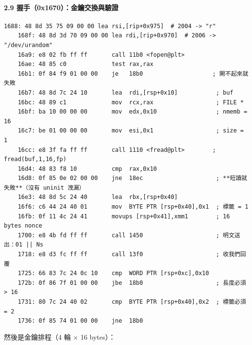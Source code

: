 \documentclass[10pt,a4paper]{article}
\begin{document}
\paragraph{2.9
握手（0x1670）：金鑰交換與驗證}\label{ux63e1ux624b0x1670ux91d1ux9470ux4ea4ux63dbux8207ux9a57ux8b49}

\begin{Verbatim}[breaklines=true,breakanywhere=true,breakautoindent=false,fontsize=\fontsize{7.0}{9.5}\selectfont]
    1688: 48 8d 35 75 09 00 00 lea rsi,[rip+0x975]  # 2004 -> "r"
    168f: 48 8d 3d 70 09 00 00 lea rdi,[rip+0x970]  # 2006 -> "/dev/urandom"
    16a9: e8 02 fb ff ff       call 11b0 <fopen@plt>
    16ae: 48 85 c0             test rax,rax
    16b1: 0f 84 f9 01 00 00    je   18b0                    ; 開不起來就失敗
    16b7: 48 8d 7c 24 10       lea  rdi,[rsp+0x10]           ; buf
    16bc: 48 89 c1             mov  rcx,rax                  ; FILE *
    16bf: ba 10 00 00 00       mov  edx,0x10                 ; nmemb = 16
    16c7: be 01 00 00 00       mov  esi,0x1                  ; size = 1
    16cc: e8 3f fa ff ff       call 1110 <fread@plt>        ; fread(buf,1,16,fp)
    16d4: 48 83 f8 10          cmp  rax,0x10
    16d8: 0f 85 0e 02 00 00    jne  18ec                     ; **短讀就失敗**（沒有 uninit 洩漏）
    16e3: 48 8d 5c 24 40       lea  rbx,[rsp+0x40]
    16f6: c6 44 24 40 01       mov  BYTE PTR [rsp+0x40],0x1  ; 標籤 = 1
    16fb: 0f 11 4c 24 41       movups [rsp+0x41],xmm1        ; 16 bytes nonce
    1700: e8 4b fd ff ff       call 1450                     ; 明文送出：01 || Ns
    1718: e8 d3 fc ff ff       call 13f0                     ; 收我們回覆
    1725: 66 83 7c 24 0c 10    cmp  WORD PTR [rsp+0xc],0x10
    172b: 0f 86 7f 01 00 00    jbe  18b0                     ; 長度必須 > 16
    1731: 80 7c 24 40 02       cmp  BYTE PTR [rsp+0x40],0x2  ; 標籤必須 = 2
    1736: 0f 85 74 01 00 00    jne  18b0
\end{Verbatim}

然後是金鑰排程（4 輪 × 16 bytes）：
\end{document}
